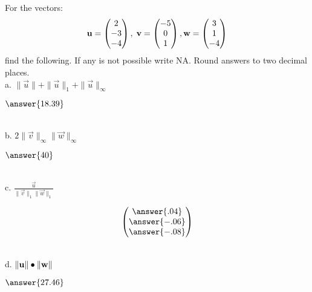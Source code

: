 \documentclass{ximera}
\author{Parisa Fatheddin}
\begin{document}
\begin{exercise}


For the vectors:
\[\vec{u}= \begin{pmatrix}
2\\
-3\\
-4
\end{pmatrix}, \hspace{.1cm} \vec{v} = \begin{pmatrix} -5\\ 0\\ 1 \end{pmatrix}, \\
\vec{w} = \begin{pmatrix} 3 \\ 1 \\ -4 \end{pmatrix}\]
find the following. If any is not possible write NA. Round answers to two decimal places. \\

a. $\|\vec{u}\| + \|\vec{u}\|_{1} + \|\vec{u}\|_{\infty}$ \\

\begin{prompt}
$\answer{18.39}$
\end{prompt} \\

b. $2 \|\vec{v}\|_{\infty} \|\vec{w}\|_{\infty}$ \\

\begin{prompt}
$\answer{40}$
\end{prompt}\\

c. $\frac{\vec{u}}{\|\vec{v}\|_{1} \|\vec{w}\|_{1}}$ \\

\begin{prompt}
\[\begin{pmatrix} \answer{.04} \\
\answer{-.06} \\
\answer{-.08}
\end{pmatrix}\]
\end{prompt} \\

d. $\|\vec{u}\| \dotp \|\vec{w}\|$ \\

\begin{prompt}
$\answer{27.46}$
\end{prompt} \\


\end{exercise}
\end{document}
